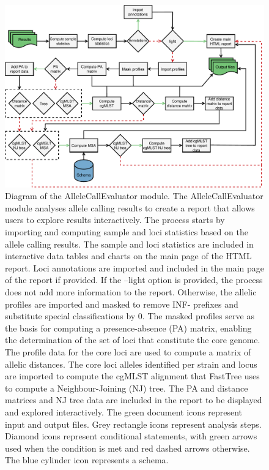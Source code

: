\newpage
\begin{figure}[h!]
    \centering
    \includegraphics[angle=0,width=\textwidth]{figures/chapter 2/FigureS22.pdf}
    \caption{Diagram of the AlleleCallEvaluator module. The AlleleCallEvaluator module analyses allele calling results to create a report that allows users to explore results interactively. The process starts by importing and computing sample and loci statistics based on the allele calling results. The sample and loci statistics are included in interactive data tables and charts on the main page of the HTML report. Loci annotations are imported and included in the main page of the report if provided. If the --light option is provided, the process does not add more information to the report. Otherwise, the allelic profiles are imported and masked to remove INF- prefixes and substitute special classifications by 0. The masked profiles serve as the basis for computing a presence-absence (PA) matrix, enabling the determination of the set of loci that constitute the core genome. The profile data for the core loci are used to compute a matrix of allelic distances. The core loci alleles identified per strain and locus are imported to compute the cgMLST alignment that FastTree uses to compute a Neighbour-Joining (NJ) tree. The PA and distance matrices and NJ tree data are included in the report to be displayed and explored interactively. The green document icons represent input and output files. Grey rectangle icons represent analysis steps. Diamond icons represent conditional statements, with green arrows used when the condition is met and red dashed arrows otherwise. The blue cylinder icon represents a schema.}
    \label{fig:chap2_figureS22}
\end{figure}

